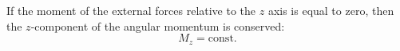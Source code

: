 If the moment of the external forces relative to the $z$ axis is equal to zero, then the $z$-component of the angular momentum is conserved:
$$M_z = \text{const}.$$
